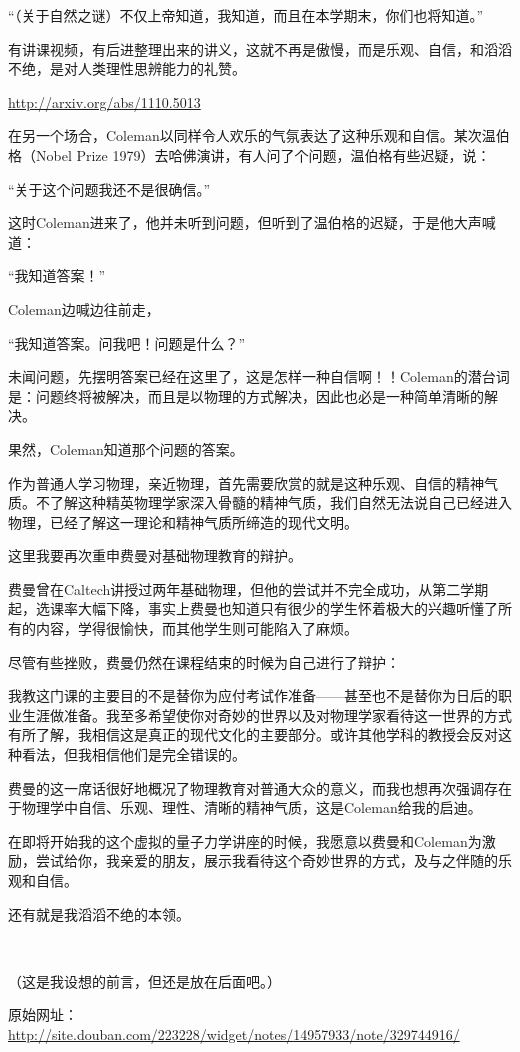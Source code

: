 “（关于自然之谜）不仅上帝知道，我知道，而且在本学期末，你们也将知道。”

有讲课视频，有后进整理出来的讲义，这就不再是傲慢，而是乐观、自信，和滔滔不绝，是对人类理性思辨能力的礼赞。

\url{http://arxiv.org/abs/1110.5013}

在另一个场合，Coleman以同样令人欢乐的气氛表达了这种乐观和自信。某次温伯格（Nobel Prize 1979）去哈佛演讲，有人问了个问题，温伯格有些迟疑，说：

“关于这个问题我还不是很确信。”

这时Coleman进来了，他并未听到问题，但听到了温伯格的迟疑，于是他大声喊道：

“我知道答案！”

Coleman边喊边往前走，

“我知道答案。问我吧！问题是什么？”

未闻问题，先摆明答案已经在这里了，这是怎样一种自信啊！！Coleman的潜台词是：问题终将被解决，而且是以物理的方式解决，因此也必是一种简单清晰的解决。

果然，Coleman知道那个问题的答案。

作为普通人学习物理，亲近物理，首先需要欣赏的就是这种乐观、自信的精神气质。不了解这种精英物理学家深入骨髓的精神气质，我们自然无法说自己已经进入物理，已经了解这一理论和精神气质所缔造的现代文明。

这里我要再次重申费曼对基础物理教育的辩护。

费曼曾在Caltech讲授过两年基础物理，但他的尝试并不完全成功，从第二学期起，选课率大幅下降，事实上费曼也知道只有很少的学生怀着极大的兴趣听懂了所有的内容，学得很愉快，而其他学生则可能陷入了麻烦。

尽管有些挫败，费曼仍然在课程结束的时候为自己进行了辩护：

我教这门课的主要目的不是替你为应付考试作准备——甚至也不是替你为日后的职业生涯做准备。我至多希望使你对奇妙的世界以及对物理学家看待这一世界的方式有所了解，我相信这是真正的现代文化的主要部分。或许其他学科的教授会反对这种看法，但我相信他们是完全错误的。

费曼的这一席话很好地概况了物理教育对普通大众的意义，而我也想再次强调存在于物理学中自信、乐观、理性、清晰的精神气质，这是Coleman给我的启迪。

在即将开始我的这个虚拟的量子力学讲座的时候，我愿意以费曼和Coleman为激励，尝试给你，我亲爱的朋友，展示我看待这个奇妙世界的方式，及与之伴随的乐观和自信。

还有就是我滔滔不绝的本领。

~~

（这是我设想的前言，但还是放在后面吧。）

原始网址：\url{http://site.douban.com/223228/widget/notes/14957933/note/329744916/}
